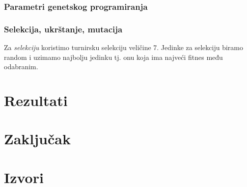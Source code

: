 \documentclass{article}
\begin{document}
\subsubsection{Parametri genetskog programiranja}

\subsubsection{Selekcija, ukrštanje, mutacija}
Za \textit{selekciju} koristimo turnirsku selekciju veličine 7. Jedinke za selekciju biramo random i uzimamo najbolju jedinku tj. onu koja ima najveći fitnes među odabranim.

\section{Rezultati}
\section{Zaključak}
\section{Izvori}
\end{document}
